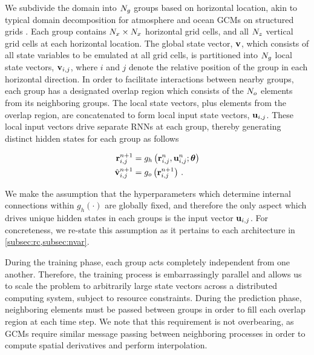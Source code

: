 We subdivide the domain into $N_{g}$ groups based on horizontal location,
akin to typical domain decomposition for atmosphere and ocean
GCMs on structured grids .
Each group contains
$N_{x}\times N_{x}$ horizontal grid cells, and all $N_{z}$
vertical grid cells at each horizontal location.
The global state vector, $\mathbf{v}$, which consists of all state variables to be
emulated at all grid cells, is partitioned into $N_{g}$ local state vectors,
$\mathbf{v}_{i,j}$, where $i$ and $j$ denote the relative position of the group in
each horizontal direction.
In order to facilitate interactions between nearby groups, each group
has a designated overlap region which consists of the $N_{o}$ elements
from its neighboring groups.
The local state vectors, plus elements from the overlap region, are concatenated
to form local input state vectors, $\mathbf{u}_{i,j}$.
These local input vectors drive separate RNNs at each group, thereby generating
distinct hidden states for each group as follows
\begin{linenomath*}\begin{equation}
    \begin{aligned}
        \mathbf{r}_{i,j}^{n+1}
        &= g_h\left(
            \mathbf{r}_{i,j}^n, \mathbf{u}_{i,j}^n; \bm{\theta}
        \right) \\
        \hat{\mathbf{v}}_{i,j}^{n+1}
        &= g_o\left(\mathbf{r}_{i,j}^{n+1}\right) \, .
    \end{aligned}
    \label{eq:local-rnn}
\end{equation}\end{linenomath*}
We make the assumption that the hyperparameters which determine internal
connections within $g_h(\cdot)$ are globally fixed, and therefore the only
aspect which drives unique hidden states in each groups is the input vector
$\mathbf{u}_{i,j}$.
For concreteness, we re-state this assumption as it pertains to each
architecture in \cref{subsec:rc,subsec:nvar}.

During the training phase, each group acts completely independent from one
another.
Therefore, the training process is embarrassingly parallel and allows us to
scale the problem to arbitrarily large state vectors across a distributed
computing system, subject to resource constraints.
During the prediction phase, neighboring elements must be passed between
groups in order to fill each overlap region at each time step.
We note that this requirement is not overbearing, as GCMs require similar
message passing between neighboring processes in order to compute spatial
derivatives and perform interpolation.



